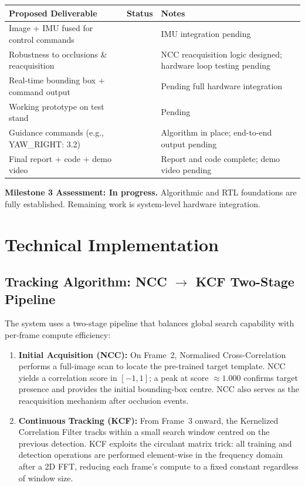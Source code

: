 \documentclass[12pt,a4paper]{article}
\newcommand{\prt}{\textcolor{StatusAmber}{\ding{119}}}
\newcommand{\pnd}{\textcolor{StatusRed}{\ding{54}}}
\begin{document}
\begin{center}
\begin{tabularx}{\linewidth}{L{5.5cm} C{1.6cm} X}
\toprule
{}
\textbf{Proposed Deliverable} & \textbf{Status} & \textbf{Notes} \\
\midrule
Image + IMU fused for control commands & \pnd & IMU integration pending \\
Robustness to occlusions \& reacquisition & \prt & NCC reacquisition logic designed; hardware loop testing pending \\
Real-time bounding box + command output & \pnd & Pending full hardware integration \\
Working prototype on test stand & \pnd & Pending \\
Guidance commands (e.g., YAW\_RIGHT: 3.2\textdegree{}) & \pnd & Algorithm in place; end-to-end output pending \\
Final report + code + demo video & \prt & Report and code complete; demo video pending \\
\bottomrule
\end{tabularx}
\end{center}

\medskip
\textbf{Milestone 3 Assessment: In progress.} Algorithmic and RTL foundations are fully established. Remaining work is system-level hardware integration.

\section{Technical Implementation}

\subsection{Tracking Algorithm: NCC $\to$ KCF Two-Stage Pipeline}

The system uses a two-stage pipeline that balances global search capability with per-frame compute efficiency:

\begin{enumerate}[leftmargin=*, label=\textbf{Stage \arabic*.}, itemsep=6pt]
\item \textbf{Initial Acquisition (NCC):} On Frame~2, Normalised Cross-Correlation performs a full-image scan to locate the pre-trained target template. NCC yields a correlation score in $[-1, 1]$; a peak at score $\approx 1.000$ confirms target presence and provides the initial bounding-box centre. NCC also serves as the reacquisition mechanism after occlusion events.

\item \textbf{Continuous Tracking (KCF):} From Frame~3 onward, the Kernelized Correlation Filter tracks within a small search window centred on the previous detection. KCF exploits the circulant matrix trick: all training and detection operations are performed element-wise in the frequency domain after a 2D FFT, reducing each frame's compute to a fixed constant regardless of window size.
\end{enumerate}
\end{document}
